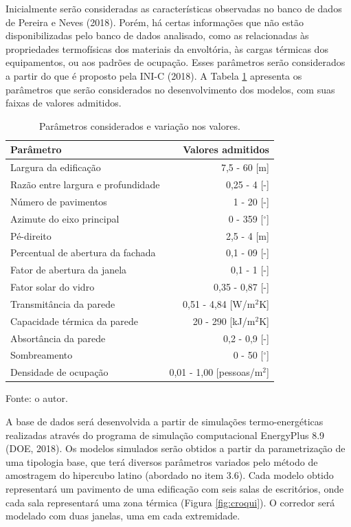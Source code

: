 \documentclass[brazil,hardcopy,openany,a5paper]{ufscthesis}
\begin{document}
	Inicialmente serão consideradas as características observadas no banco de dados de Pereira e Neves (2018). Porém, há certas informações que não estão disponibilizadas pelo banco de dados analisado, como as relacionadas às propriedades termofísicas dos materiais da envoltória, às cargas térmicas dos equipamentos, ou aos padrões de ocupação. Esses parâmetros serão considerados a partir do que é proposto pela INI-C (2018). A Tabela \ref{table:parametros} apresenta os parâmetros que serão considerados no desenvolvimento dos modelos, com suas faixas de valores admitidos.	
	
	\begin{table}[!h]
		\centering
		\caption{Parâmetros considerados e variação nos valores.}
		\label{table:parametros}
		\begin{tabular}{|l |r |}
			\hline
			\textbf{Parâmetro} & \textbf{Valores admitidos} \\
			\hline
			Largura da edificação & 7,5 - 60 [m] \\
			\hline
			Razão entre largura e profundidade & 0,25 - 4 [-] \\
			\hline
			Número de pavimentos & 1 - 20 [-] \\
			\hline 
			Azimute do eixo principal & 0 - 359 [$^{\circ}$] \\
			\hline 
			Pé-direito & 2,5 - 4 [m] \\
			\hline 
			Percentual de abertura da fachada & 0,1 - 09 [-] \\
			\hline 
			Fator de abertura da janela & 0,1 - 1 [-] \\
			\hline 
			Fator solar do vidro & 0,35 - 0,87 [-] \\
			\hline 
			Transmitância da parede & 0,51 - 4,84 [W/m$^2$K] \\
			\hline 
			Capacidade térmica da parede & 20 - 290 [kJ/m$^2$K] \\
			\hline 
			Absortância da parede & 0,2 - 0,9 [-] \\
			\hline 
			Sombreamento & 0 - 50 [$^{\circ}$] \\
			\hline 
			Densidade de ocupação & 0,01 - 1,00 [pessoas/m$^2$] \\
			\hline 
		\end{tabular}
		\begin{flushleft}
			Fonte: o autor.
		\end{flushleft}				
	\end{table}
	
	A base de dados será desenvolvida a partir de simulações termo-energéticas realizadas através do programa de simulação computacional EnergyPlus 8.9 (DOE, 2018). Os modelos simulados serão obtidos a partir da parametrização de uma tipologia base, que terá diversos parâmetros variados pelo método de amostragem do hipercubo latino (abordado no item 3.6). Cada modelo obtido representará um pavimento de uma edificação com seis salas de escritórios, onde cada sala representará uma zona térmica (Figura \ref{fig:croqui}). O corredor será modelado com duas janelas, uma em cada extremidade.
	
\end{document}
